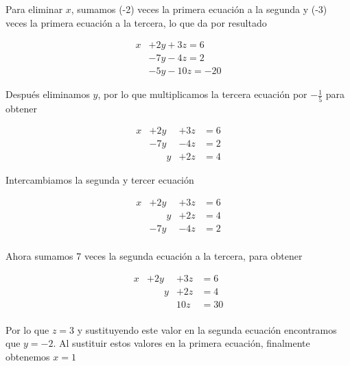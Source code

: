 \documentclass{article}
\begin{document}
Para eliminar $x$, sumamos (-2) veces la primera ecuación a la segunda y (-3) veces la primera ecuación a la tercera, lo que da por resultado

\begin{equation*}
    \begin{aligned}
            x & +2y + 3z = 6\\
            & -7y - 4z = 2\\
            & -5y -10z = -20
    \end{aligned}
\end{equation*}

Después eliminamos $y$, por lo que multiplicamos la tercera ecuación por $-\frac{1}{5}$ para obtener

\begin{equation*}
    \begin{aligned}
            x & +2y & + 3z &= 6\\
            & -7y & - 4z &= 2\\
            &\phantom{-98} y & + 2z &= 4
    \end{aligned}
\end{equation*}

Intercambiamos la segunda y tercer ecuación

\begin{equation*}
    \begin{aligned}
            x & +2y & + 3z &= 6\\
            &\phantom{-98} y & + 2z &= 4\\
            & -7y & - 4z &= 2\\
    \end{aligned}
\end{equation*}

Ahora sumamos 7 veces la segunda ecuación a la tercera, para obtener

\begin{equation*}
    \begin{aligned}
            x & +2y & + 3z &= 6\\
            &\phantom{-98} y & + 2z &= 4\\
            & & 10z &= 30\\
    \end{aligned}
\end{equation*}

Por lo que $z=3$ y sustituyendo este valor en la segunda ecuación encontramos que $y=-2$. Al sustituir estos valores en la primera ecuación, finalmente obtenemos $x=1$ 
\end{document}
